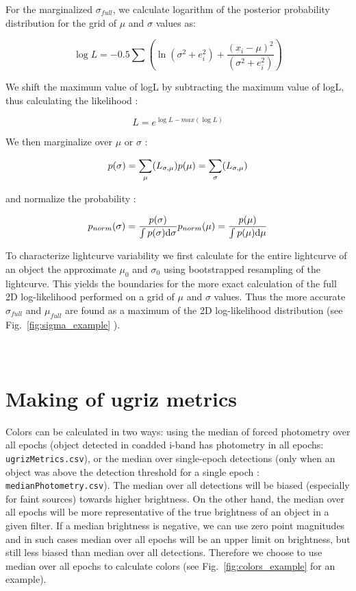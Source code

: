 \documentclass[fleqn,usenatbib]{mnras}  %
\begin{document}
For the marginalized $\sigma_{full}$, we calculate logarithm of the posterior probability distribution for the grid of $\mu$ and $\sigma$ values as:

\begin{equation}
\log{L} = -0.5 \sum \left( \ln(\sigma^{2}+e_{i}^{2}) + \frac{(x_{i}-\mu)^{2}}{(\sigma^{2}+e_{i}^{2})} \right)
\end{equation}

We shift the maximum value of logL by subtracting the maximum value of logL, thus calculating the likelihood : 

\begin{equation}
L = e^{\log{L} - max(\log{L})}
\end{equation}

We then marginalize over $\mu$ or $\sigma$ : 

\begin{equation}
p(\sigma) = \sum_{\mu}(L_{\sigma,\mu}) \\
p(\mu) = \sum_{\sigma}(L_{\sigma,\mu})
\end{equation}

and normalize the probability :

\begin{equation}
p_{norm}(\sigma) = \frac{p(\sigma)}{ \int {p(\sigma) \text{d}\sigma}} \\ 
p_{norm}(\mu) = \frac{p(\mu)} {\int {p(\mu) \text{d}\mu} }
\end{equation}


To characterize  lightcurve variability we first calculate for the entire lightcurve of an object  the approximate $\mu_{0}$ and $\sigma_{0}$ using bootstrapped resampling of the lightcurve.  This yields the boundaries for the more exact calculation of the full 2D log-likelihood performed on a grid of $\mu$ and $\sigma$ values. Thus the more accurate $\sigma_{full}$ and $\mu_{full}$ are found as a maximum of the 2D log-likelihood distribution (see Fig.~\ref{fig:sigma_example} ).



\section{\\ Making of ugriz metrics }
\label{App:AppendixC}

Colors can be calculated in two ways: using the median of forced photometry over all epochs (object detected in coadded i-band has photometry in all epochs:  \verb|ugrizMetrics.csv|), or the median over single-epoch detections (only when an object was above the detection threshold for a single epoch : \verb|medianPhotometry.csv|).  
The median over all detections will be biased (especially for faint sources) towards higher brightness.  On the other hand, the median over all epochs will be more representative of the true brightness of an object in a given filter.  If a median brightness is negative, we can use zero point magnitudes and in such cases median over all epochs will be an upper limit on brightness, but still less biased than median over all detections. Therefore  we choose to use median over all epochs to calculate colors (see Fig.~\ref{fig:colors_example} for an example).  
\end{document}
